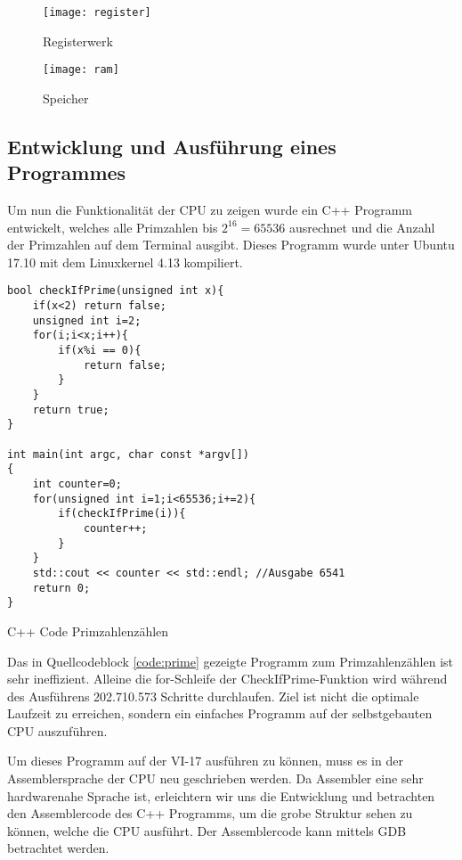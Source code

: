 \documentclass[12pt]{article}
\begin{document}
\newpage

\begin{figure}[!htbp]
\texttt{[image: register]}
\centering
\label{fig:register}
\caption{Registerwerk}
\end{figure}

\newpage

\begin{figure}[!hp]
\texttt{[image: ram]}
\centering
\label{fig:register}
\caption{Speicher}
\end{figure}
\newpage

\subsection{Entwicklung und Ausführung eines Programmes}
Um nun die Funktionalität der CPU zu zeigen wurde ein C++ Programm entwickelt, welches alle Primzahlen bis $2^{16} = 65536$ ausrechnet und die Anzahl der Primzahlen auf dem Terminal ausgibt. Dieses Programm wurde unter Ubuntu 17.10 mit dem Linuxkernel 4.13 kompiliert.

\begin{code}[!htb]
\begin{lstlisting}
bool checkIfPrime(unsigned int x){
	if(x<2) return false;
	unsigned int i=2;
	for(i;i<x;i++){
		if(x%i == 0){
			return false;
		}
	}
	return true;
}

int main(int argc, char const *argv[])
{
	int counter=0;
	for(unsigned int i=1;i<65536;i+=2){
		if(checkIfPrime(i)){
			counter++;
		}
	}
	std::cout << counter << std::endl; //Ausgabe 6541
	return 0;
}
\end{lstlisting}
\caption[C++ Code Primzahlenzählen]{C++ Code Primzahlenzählen}
\label{code:prime}
\end{code}

\noindent Das in Quellcodeblock \ref{code:prime} gezeigte Programm zum Primzahlenzählen ist sehr ineffizient. Alleine die for-Schleife der CheckIfPrime-Funktion wird während des Ausführens 202.710.573 Schritte durchlaufen. Ziel ist nicht die optimale Laufzeit zu erreichen, sondern ein einfaches Programm auf der selbstgebauten CPU auszuführen.

\par\bigskip\noindent Um dieses Programm auf der VI-17 ausführen zu können, muss es in der Assemblersprache der CPU neu geschrieben werden. Da Assembler eine sehr hardwarenahe Sprache ist, erleichtern wir uns die Entwicklung und betrachten den Assemblercode des C++ Programms, um die grobe Struktur sehen zu können, welche die CPU ausführt. Der Assemblercode kann mittels GDB betrachtet werden.
\newpage
\end{document}
